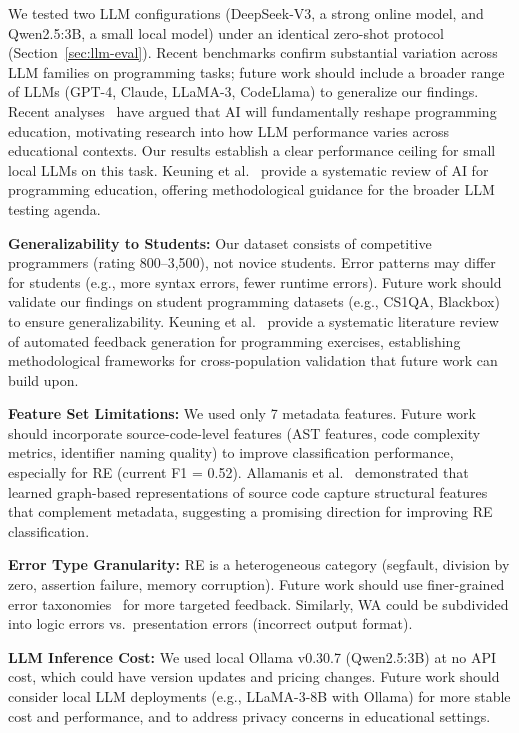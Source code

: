 \documentclass[acmsmall]{acmart}
\begin{document}
We tested two LLM configurations (DeepSeek-V3, a strong online model, and
Qwen2.5:3B, a small local model) under an identical zero-shot protocol
(Section~\ref{sec:llm-eval}). Recent benchmarks\cite{denny2024prompt}
confirm substantial variation across LLM families on programming tasks; future work
should include a broader range of LLMs (GPT-4, Claude, LLaMA-3, CodeLlama) to
generalize our findings. Recent analyses~\cite{finnie2022robots} have argued that AI will
fundamentally reshape programming education, motivating research into how LLM
performance varies across educational contexts. Our results establish a clear
performance ceiling for
small local LLMs on this task. Keuning et al.~\cite{keuning2017systematic} provide a systematic
review of AI for programming education, offering
methodological guidance for the broader LLM testing agenda.

\textbf{Generalizability to Students:} Our dataset consists of competitive
programmers (rating 800--3,500), not novice students. Error patterns may
differ for students (e.g., more syntax errors, fewer runtime errors). Future
work should validate our findings on student programming datasets (e.g., CS1QA\cite{lee2022cs1qa}, Blackbox\cite{brown2014blackbox}) to ensure
generalizability. Keuning et al.~\cite{keuning2017systematic} provide a systematic
literature review of automated feedback generation for programming exercises,
establishing methodological frameworks for cross-population validation that
future work can build upon.

\textbf{Feature Set Limitations:} We used only 7 metadata features. Future
work should incorporate source-code-level features (AST features, code
complexity metrics, identifier naming quality) to improve classification
performance, especially for RE (current F1 = 0.52). Allamanis et al.~\cite{allamanis2018learning} demonstrated that learned
graph-based representations of source code capture structural features that
complement metadata, suggesting a promising direction for improving RE
classification.

\textbf{Error Type Granularity:} RE is a heterogeneous category (segfault,
division by zero, assertion failure, memory corruption). Future work should
use finer-grained error taxonomies~\cite{altadmri2015most} for more targeted
feedback. Similarly, WA could be subdivided into logic errors vs.\ presentation
errors (incorrect output format).

\textbf{LLM Inference Cost:} We used local Ollama v0.30.7 (Qwen2.5:3B) at no API cost, which
could have version updates and pricing changes. Future work should consider
local LLM deployments (e.g., LLaMA-3-8B with Ollama) for more stable cost and
performance, and to address privacy concerns in educational settings.
\end{document}
